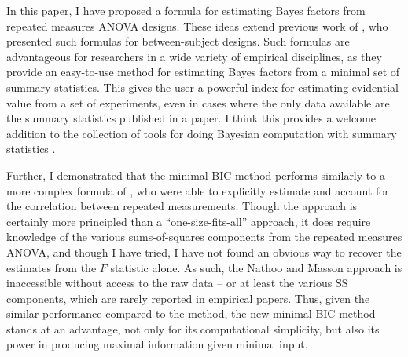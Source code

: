 \documentclass[12pt,twoside,a4paper]{article}
\begin{document}
In this paper, I have proposed a formula for estimating Bayes factors from repeated measures ANOVA designs. These ideas extend previous work of \citet{faulkenberry2018}, who presented such formulas for between-subject designs. Such formulas are advantageous for researchers in a wide variety of empirical disciplines, as they provide an easy-to-use method for estimating Bayes factors from a minimal set of summary statistics. This gives the user a powerful index for estimating evidential value from a set of experiments, even in cases where the only data available are the summary statistics published in a paper. I think this provides a welcome addition to the collection of tools for doing Bayesian computation with summary statistics \citep[e.g.,][]{ly2018,faulkenberry2019}.

Further, I demonstrated that the minimal BIC method performs similarly to a more complex formula of \citet{nathoo2016}, who were able to explicitly estimate and account for the correlation between repeated measurements. Though the \citet{nathoo2016} approach is certainly more principled than a ``one-size-fits-all'' approach, it does require knowledge of the various sums-of-squares components from the repeated measures ANOVA, and though I have tried, I have not found an obvious way to recover the \citet{nathoo2016} estimates from the $F$ statistic alone. As such, the Nathoo and Masson approach is inaccessible without access to the raw data -- or at least the various SS components, which are rarely reported in empirical papers. Thus, given the similar performance compared to the \citet{nathoo2016} method, the new minimal BIC method stands at an advantage, not only for its computational simplicity, but also its power in producing maximal information given minimal input. 



\end{document}
